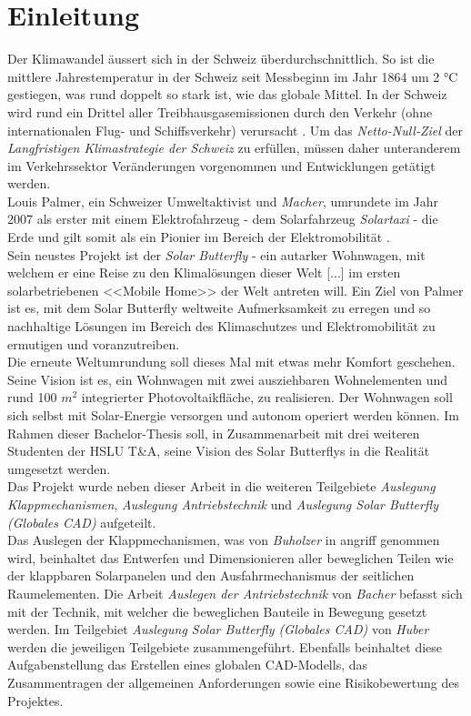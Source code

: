 \section{Einleitung}
Der Klimawandel äussert sich in der Schweiz überdurchschnittlich. So ist die mittlere Jahrestemperatur in der Schweiz seit Messbeginn im Jahr 1864 um 2 °C gestiegen, was rund doppelt so stark ist, wie das globale Mittel. In der Schweiz wird rund ein Drittel aller Treibhausgasemissionen durch den Verkehr (ohne internationalen Flug- und Schiffsverkehr) verursacht \cite{BAFU}. Um das \emph{Netto-Null-Ziel} der \emph{Langfristigen Klimastrategie der Schweiz} zu erfüllen, müssen daher unteranderem im Verkehrssektor Veränderungen vorgenommen und Entwicklungen getätigt werden.\\
Louis Palmer, ein Schweizer Umweltaktivist und \glqq \emph{Macher}\grqq{}, umrundete im Jahr 2007 als erster mit einem Elektrofahrzeug - dem Solarfahrzeug \emph{Solartaxi} - die Erde und gilt somit als ein Pionier im Bereich der Elektromobilität \cite{Palmer}.\\
Sein neustes Projekt ist der \emph{Solar Butterfly} - ein autarker Wohnwagen, mit welchem er \glqq eine Reise zu den Klimalösungen dieser Welt [...] im ersten solarbetriebenen <<Mobile Home>> der Welt\grqq{} antreten will. Ein Ziel von Palmer ist es, mit dem Solar Butterfly weltweite Aufmerksamkeit zu erregen und so nachhaltige Lösungen im Bereich des Klimaschutzes und Elektromobilität zu ermutigen und voranzutreiben.\\
Die erneute Weltumrundung soll dieses Mal \glqq mit etwas mehr Komfort\grqq{} geschehen. Seine Vision ist es, ein Wohnwagen mit zwei ausziehbaren Wohnelementen und rund 100 $m^2$ integrierter Photovoltaikfläche, zu realisieren. Der Wohnwagen soll sich selbst mit Solar-Energie versorgen und autonom operiert werden können. Im Rahmen dieser Bachelor-Thesis soll, in Zusammenarbeit mit drei weiteren Studenten der HSLU T\&A, seine Vision des Solar Butterflys in die Realität umgesetzt werden.\\
Das Projekt wurde neben dieser Arbeit in die weiteren Teilgebiete \emph{Auslegung Klappmechanismen}, \emph{Auslegung Antriebstechnik} und \emph{Auslegung Solar Butterfly (Globales CAD)} aufgeteilt.\\
Das Auslegen der Klappmechanismen, was von \emph{Buholzer} in angriff genommen wird, beinhaltet das Entwerfen und Dimensionieren aller beweglichen Teilen wie der klappbaren Solarpanelen und den Ausfahrmechanismus der seitlichen Raumelementen. Die Arbeit \emph{Auslegen der Antriebstechnik} von \emph{Bacher} befasst sich mit der Technik, mit welcher die beweglichen Bauteile in Bewegung gesetzt werden. Im Teilgebiet \emph{Auslegung Solar Butterfly (Globales CAD)} von \emph{Huber} werden die jeweiligen Teilgebiete zusammengeführt. Ebenfalls beinhaltet diese Aufgabenstellung das Erstellen eines globalen CAD-Modells, das Zusammentragen der allgemeinen Anforderungen sowie eine Risikobewertung des Projektes.

